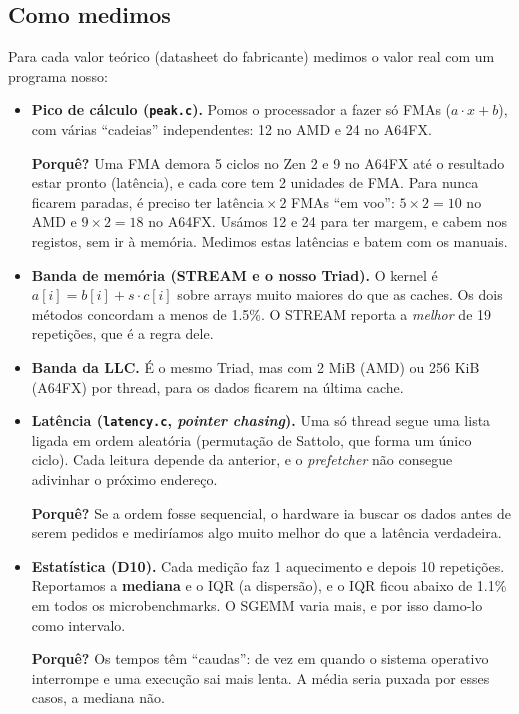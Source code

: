 \documentclass[11pt,a4paper]{article}
\newcommand{\porque}[1]{\par\noindent\colorbox{blue!6}{\parbox{\dimexpr\linewidth-2\fboxsep}{\small\textbf{Porquê?} #1}}\par}
\begin{document}
\subsection{Como medimos}
Para cada valor teórico (datasheet do fabricante) medimos o valor real com um programa nosso:

\begin{itemize}
\item \textbf{Pico de cálculo (\texttt{peak.c}).} Pomos o processador a fazer só FMAs ($a\cdot x+b$),
com várias ``cadeias'' independentes: 12 no AMD e 24 no A64FX.
\porque{Uma FMA demora 5 ciclos no Zen 2 e 9 no A64FX até o resultado estar pronto (latência), e cada core
tem 2 unidades de FMA. Para nunca ficarem paradas, é preciso ter $\text{latência}\times 2$ FMAs ``em voo'':
$5\times2=10$ no AMD e $9\times2=18$ no A64FX. Usámos 12 e 24 para ter margem, e cabem nos registos, sem
ir à memória. Medimos estas latências e batem com os manuais.}
\item \textbf{Banda de memória (STREAM e o nosso Triad).} O kernel é $a[i] = b[i] + s\cdot c[i]$ sobre
arrays muito maiores do que as caches. Os dois métodos concordam a menos de 1.5\%. O STREAM reporta a
\emph{melhor} de 19 repetições, que é a regra dele.
\item \textbf{Banda da LLC.} É o mesmo Triad, mas com 2 MiB (AMD) ou 256 KiB (A64FX) por thread, para os
dados ficarem na última cache.
\item \textbf{Latência (\texttt{latency.c}, \emph{pointer chasing}).} Uma só thread segue uma lista
ligada em ordem aleatória (permutação de Sattolo, que forma um único ciclo). Cada leitura depende da
anterior, e o \emph{prefetcher} não consegue adivinhar o próximo endereço.
\porque{Se a ordem fosse sequencial, o hardware ia buscar os dados antes de serem pedidos e mediríamos
algo muito melhor do que a latência verdadeira.}
\item \textbf{Estatística (D10).} Cada medição faz 1 aquecimento e depois 10 repetições. Reportamos a
\textbf{mediana} e o IQR (a dispersão), e o IQR ficou abaixo de 1.1\% em todos os microbenchmarks. O SGEMM varia mais, e por
isso damo-lo como intervalo.
\porque{Os tempos têm ``caudas'': de vez em quando o sistema operativo interrompe e uma execução sai mais
lenta. A média seria puxada por esses casos, a mediana não.}
\end{itemize}
\end{document}
